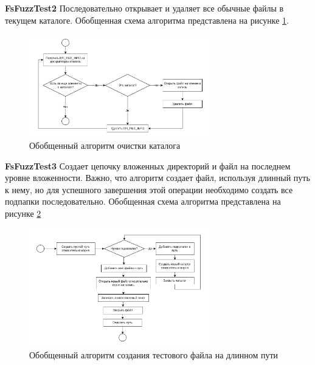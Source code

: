 \textbf{FsFuzzTest2} Последовательно открывает и удаляет все обычные файлы в текущем каталоге. Обобщенная схема алгоритма представлена на рисунке \ref{met:pic:fsfuzztestii}. 
\begin{figure}[htbp]
	\centering %
	\includegraphics[width=0.7\textwidth]{FsFuzzTestII.pdf} %
	\caption{Обобщенный алгоритм очистки каталога} %
	\label{met:pic:fsfuzztestii} %
\end{figure}

\textbf{FsFuzzTest3} Создает цепочку вложенных директорий и файл на последнем уровне вложенности. Важно, что алгоритм создает файл, используя длинный путь к нему, но для успешного завершения этой операции необходимо создать все подпапки последовательно. Обобщенная схема алгоритма представлена на рисунке \ref{met:pic:fsfuzztestiii} 
\begin{figure}[h]
	\centering %
	\includegraphics[width=0.7\textwidth]{FsFuzzTestIII.pdf} %
	\caption{Обобщенный алгоритм создания тестового файла на длинном пути } %
	\label{met:pic:fsfuzztestiii} %
\end{figure}

